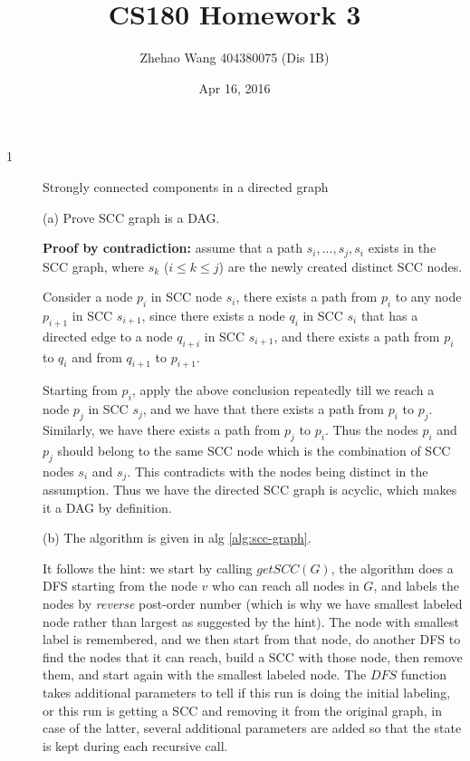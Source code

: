 \documentclass{article}
\title{CS180 Homework 3}
\author{Zhehao Wang 404380075 (Dis 1B)}
\date{Apr 16, 2016}
\begin{document}
\maketitle

\begin{description}

\item[1]{Strongly connected components in a directed graph}
  
  (a) Prove SCC graph is a DAG.

  \textbf{Proof by contradiction:} assume that a path $s_i, ..., s_j, s_i$ exists in the SCC graph, where $s_k$ ($i \leq k \leq j$) are the newly created distinct SCC nodes.

  Consider a node $p_i$ in SCC node $s_i$, there exists a path from $p_i$ to any node $p_{i+1}$ in SCC $s_{i+1}$, since there exists a node $q_i$ in SCC $s_i$ that has a directed edge to a node $q_{i+i}$ in SCC $s_{i+1}$, and there exists a path from $p_i$ to $q_i$ and from $q_{i+1}$ to $p_{i+1}$.

  Starting from $p_i$, apply the above conclusion repeatedly till we reach a node $p_j$ in SCC $s_j$, and we have that there exists a path from $p_i$ to $p_j$. Similarly, we have there exists a path from $p_j$ to $p_i$. Thus the nodes $p_i$ and $p_j$ should belong to the same SCC node which is the combination of SCC nodes $s_i$ and $s_j$. This contradicts with the nodes being distinct in the assumption. Thus we have the directed SCC graph is acyclic, which makes it a DAG by definition.

  (b) The algorithm is given in alg \ref{alg:scc-graph}. 

  It follows the hint: we start by calling $getSCC(G)$, the algorithm does a DFS starting from the node $v$ who can reach all nodes in $G$, and labels the nodes by \textit{reverse} post-order number (which is why we have smallest labeled node rather than largest as suggested by the hint). The node with smallest label is remembered, and we then start from that node, do another DFS to find the nodes that it can reach, build a SCC with those node, then remove them, and start again with the smallest labeled node. The $DFS$ function takes additional parameters to tell if this run is doing the initial labeling, or this run is getting a SCC and removing it from the original graph, in case of the latter, several additional parameters are added so that the state is kept during each recursive call.



\end{description}
\end{document}
